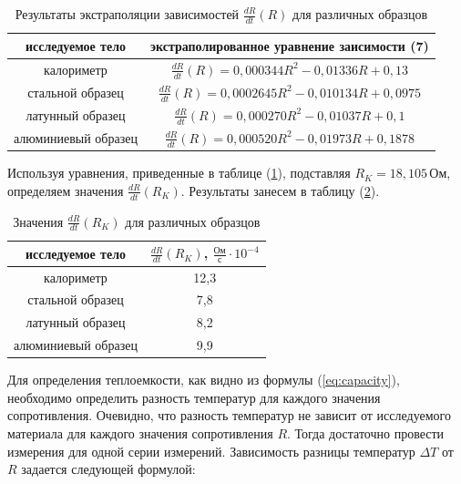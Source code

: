 \documentclass[12pt,a4paper]{article}
\begin{document}
	\begin{table}[h!]
		\centering
		\begin{tabular}{|c|c|}
		\hline
		исследуемое тело    & экстраполированное уравнение заисимости (7)                                                                                              		\\ \hline
		калориметр          & $\frac{dR}{dt} \left( R \right) = 0,000344R^{2} - 0,01336R + 0,13$     \\ \hline
		стальной образец    & $\frac{dR}{dt} \left( R \right) = 0,0002645R^{2} - 0,010134R + 0,0975$ \\ \hline
		латунный образец    & $\frac{dR}{dt} \left( R \right) = 0,000270R^{2} - 0,01037R + 0,1$      \\ \hline
		алюминиевый образец & $\frac{dR}{dt} \left( R \right) = 0,000520R^{2} - 0,01973R + 0,1878$   \\ \hline
		\end{tabular}
		\caption{Результаты экстраполяции зависимостей $\frac{dR}{dt} \left( R \right)$ для различных образцов}
		\label{tab:extrapolation_results}
	\end{table}
	
	Используя уравнения, приведенные в таблице (\ref{tab:extrapolation_results}), подставляя $R_{K} = 18,105 \, \text{Ом}$, определяем значения $\frac{dR}{dt} \left( R_{K} \right)$. Результаты занесем в таблицу (\ref{tab:derivates_results}).
	
	\begin{table}[h!]
		\centering
		\begin{tabular}{|c|c|}
		\hline
		исследуемое тело & $\frac{dR}{dt} \left( R_{K} \right)$, $\frac{\text{Ом}}{\text{с}} \cdot 10^{-4}$ \\ \hline
		калориметр          & 12,3 \\ \hline
		стальной образец    & 7,8  \\ \hline
		латунный образец    & 8,2  \\ \hline
		алюминиевый образец & 9,9  \\ \hline
		\end{tabular}
		\caption{Значения $\frac{dR}{dt} \left( R_{K} \right)$ для различных образцов}
		\label{tab:derivates_results}
	\end{table}
	
	Для определения теплоемкости, как видно из формулы (\ref{eq:capacity}), необходимо определить разность температур для каждого значения сопротивления. Очевидно, что разность температур не зависит от исследуемого материала для каждого значения сопротивления $R$. Тогда достаточно провести измерения для одной серии измерений. Зависимость разницы температур $\Delta T$ от $R$ задается следующей формулой:
	
\end{document}

